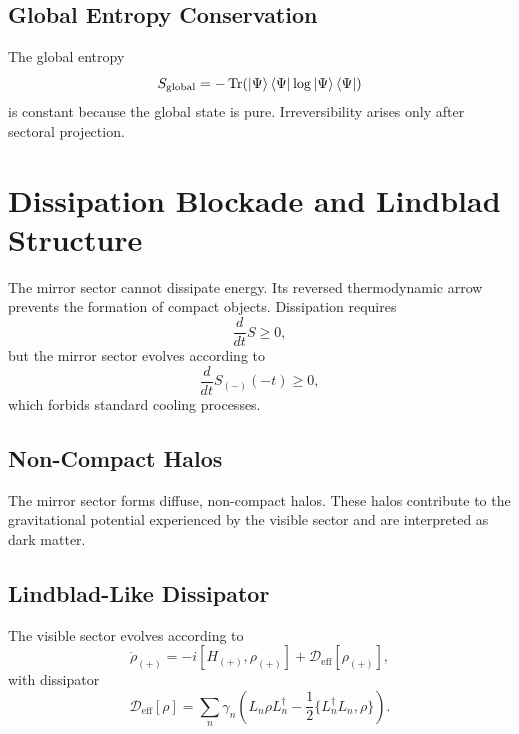 \documentclass[11pt,a4paper]{article}
\begin{document}
\subsection[Global Entropy Conservation]{Global Entropy Conservation}

The global entropy
\begin{equation}
S_{\mathrm{global}} = -\Tr(\ket{\Psi}\bra{\Psi} \log \ket{\Psi}\bra{\Psi})
\end{equation}
is constant because the global state is pure. Irreversibility arises only after
sectoral projection.

\section[Dissipation Blockade and Lindblad Structure]{Dissipation Blockade and Lindblad Structure}

The mirror sector cannot dissipate energy. Its reversed thermodynamic arrow
prevents the formation of compact objects. Dissipation requires
\begin{equation}
\frac{d}{dt} S \ge 0,
\end{equation}
but the mirror sector evolves according to
\begin{equation}
\frac{d}{dt} S_{(-)}(-t) \ge 0,
\end{equation}
which forbids standard cooling processes.

\subsection[Non-Compact Halos]{Non-Compact Halos}

The mirror sector forms diffuse, non-compact halos. These halos contribute to
the gravitational potential experienced by the visible sector and are
interpreted as dark matter.
\subsection[Lindblad-Like Dissipator]{Lindblad-Like Dissipator}

The visible sector evolves according to
\begin{equation}
\dot{\rho}_{(+)} =
- i [H_{(+)}, \rho_{(+)}]
+ \mathcal{D}_{\mathrm{eff}}[\rho_{(+)}],
\end{equation}
with dissipator
\begin{equation}
\mathcal{D}_{\mathrm{eff}}[\rho]
=
\sum_{n} \gamma_n
\left(
L_n \rho L_n^\dagger
- \frac{1}{2} \{ L_n^\dagger L_n, \rho \}
\right).
\end{equation}
\end{document}
